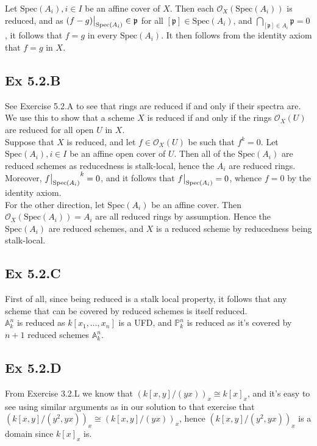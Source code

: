 \documentclass{article}
\newcommand\restr[2]{{%
  \left.\kern-\nulldelimiterspace %
  #1 %
  \vphantom{\big|} %
  \right|_{#2} %
  }}
\theoremstyle{definition}
\renewcommand{\P}{\mathbb{P}}
\newcommand{\A}{\mathbb{A}}
\newcommand{\oo}{\mathcal{O}}
\newcommand{\Spec}{\text{Spec}}
\begin{document}
Let $\Spec(A_i), i \in I$ be an affine cover of $X$. Then each
$\oo_X(\Spec(A_i))$ is reduced, and as $\restr{(f - g)}{\Spec(A_i)} \in
	\mathfrak{p}$ for all $[\mathfrak{p}] \in \Spec(A_i)$, and
$\bigcap_{[\mathfrak{p}] \in A_i} \mathfrak{p} = 0$, it follows that $f = g$ in
every $\Spec(A_i)$. It then follows from the identity axiom that $f = g$ in
$X$. \\

\subsection*{Ex 5.2.B}

See Exercise 5.2.A to see that rings are reduced if and only if their spectra
are. We use this to show that a scheme $X$ is reduced if and only if the rings
$\mathcal{O}_X(U)$ are reduced for all open $U$ in $X$. \\

Suppose that $X$ is reduced, and let $f \in \mathcal{O}_X(U)$ be such that $f^k
	= 0$. Let $\Spec(A_i), i \in I$ be an affine open cover of $U$. Then all of the
$\Spec(A_i)$ are reduced schemes as reducedness is stalk-local, hence the $A_i$
are reduced rings. Moreover, $\restr{f}{\Spec(A_i)}^k = 0$, and it follows that
$\restr{f}{\Spec(A_i)} = 0$, whence $f = 0$ by the identity axiom. \\

For the other direction, let $\Spec(A_i)$ be an affine cover. Then
$\mathcal{O}_X(\Spec(A_i)) = A_i$ are all reduced rings by assumption. Hence
the $\Spec(A_i)$ are reduced schemes, and $X$ is a reduced scheme by
reducedness being stalk-local.

\subsection*{Ex 5.2.C}

First of all, since being reduced is a stalk local property, it follows that any
scheme that can be covered by reduced schemes is itself reduced. \\

$\A_{k}^{n}$ is reduced as $k[x_1,\ldots,x_n]$ is a UFD, and $\P_{k}^{n}$ is
reduced as it's covered by $n + 1$ reduced schemes $\A_{k}^{n}$.

\subsection*{Ex 5.2.D}

From Exercise 3.2.L we know that $(k[x, y]/(yx))_x \cong k[x]_x$, and it's easy
to see using similar arguments as in our solution to that exercise that $(k[x,
			y]/(y^2, yx))_x \cong (k[x, y]/(yx))_x$, hence $(k[x, y]/(y^2, yx))_x$ is a
domain since $k[x]_x$ is. \\
\end{document}
